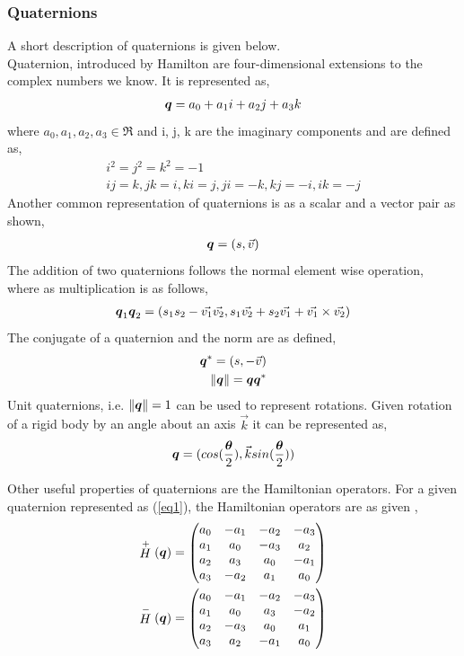 \documentclass[a4paper,12pt]{article}
\newcommand{\Hp}{\ensuremath{\stackrel{+}{H}}\xspace}
\newcommand{\Hn}{\ensuremath{\stackrel{-}{H}}\xspace}
\begin{document}
\subsubsection{Quaternions}
A short description of quaternions is given below.\\
Quaternion, introduced by Hamilton are four-dimensional extensions to the complex numbers we know. It is represented as,
\begin{align}
	\boldsymbol{q} = a_0 + a_1 i+ a_2 j+a_3 k \label{eq1}
\end{align}
where $a_0, a_1, a_2, a_3 \in \Re$ and i, j, k are the imaginary components and are defined as, 
\begin{align}
	i^2=j^2=k^2=-1 \\
	ij=k, jk=i, ki=j, ji=-k, kj=-i, ik=-j
\end{align}
Another common representation of quaternions is as a scalar and a vector pair as shown,
\begin{align}
	\boldsymbol{q} = (s, \vec{v})
\end{align} 
The addition of two quaternions follows the normal element wise operation, where as multiplication is as follows, 
\begin{align}
	\boldsymbol{q}_1\boldsymbol{q}_2 = (s_1 s_2-\vec{v_1}\vec{v_2}, s_1\vec{v_2}+s_2\vec{v_1}+\vec{v_1}\times\vec{v_2})
\end{align}
The conjugate of a quaternion and the norm are as defined, 
\begin{align}
	\boldsymbol{q}^* = (s, -\vec{v}) \\
	\| \boldsymbol{q}\| = \boldsymbol{q}\boldsymbol{q}^*
\end{align}
Unit quaternions, i.e. $\| \boldsymbol{q}\|=1$ can be used to represent rotations. Given rotation of a rigid body by an angle \bth about an axis $\vec{k}$ it can be represented as, 
\begin{align}
	\boldsymbol{q} = (cos(\frac{\boldsymbol{\theta}}{2}), \vec{k}sin(\frac{\boldsymbol{\theta}}{2}))
\end{align}

Other useful properties of quaternions are the Hamiltonian operators. For a given quaternion represented as (\ref{eq1}), the Hamiltonian operators are as given \cite{akyar2008dual},
\begin{align}
	\Hp(\bq) = \begin{pmatrix}
	a_0 & -a_1 & -a_2 & -a_3\\
	a_1 &  a_0 & -a_3 &  a_2\\
	a_2 &  a_3 &  a_0 & -a_1\\
	a_3 & -a_2 &  a_1 &  a_0\\	
	\end{pmatrix}
	\\
	\Hn(\bq) = \begin{pmatrix}
	a_0 & -a_1 & -a_2 & -a_3\\
	a_1 &  a_0 &  a_3 & -a_2\\
	a_2 & -a_3 &  a_0 &  a_1\\
	a_3 &  a_2 & -a_1 &  a_0\\	
	\end{pmatrix}
\end{align}
\end{document}
